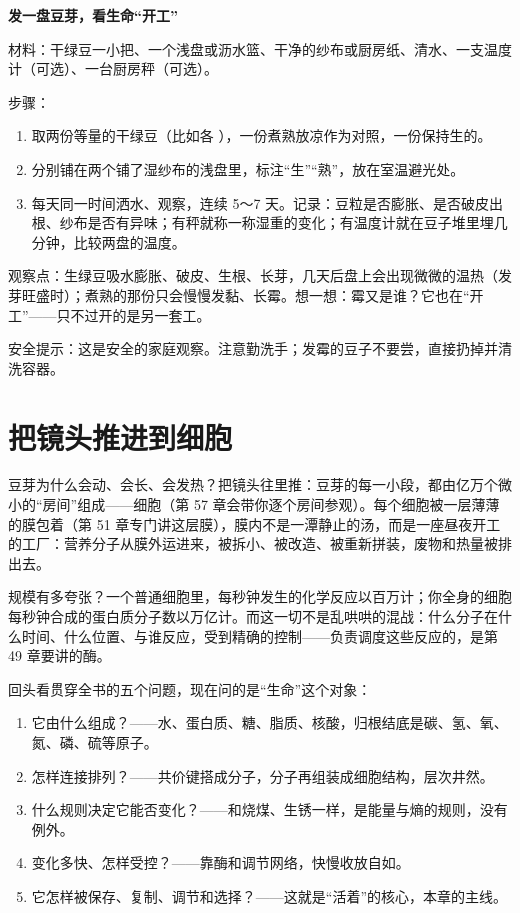 \begin{shiyan}
\textbf{发一盘豆芽，看生命“开工”}

材料：干绿豆一小把、一个浅盘或沥水篮、干净的纱布或厨房纸、清水、一支温度计（可选）、一台厨房秤（可选）。

步骤：
\begin{enumerate}[itemsep=1pt]
\item 取两份等量的干绿豆（比如各 ），一份煮熟放凉作为对照，一份保持生的。
\item 分别铺在两个铺了湿纱布的浅盘里，标注“生”“熟”，放在室温避光处。
\item 每天同一时间洒水、观察，连续 5～7 天。记录：豆粒是否膨胀、是否破皮出根、纱布是否有异味；有秤就称一称湿重的变化；有温度计就在豆子堆里埋几分钟，比较两盘的温度。
\end{enumerate}

观察点：生绿豆吸水膨胀、破皮、生根、长芽，几天后盘上会出现微微的温热（发芽旺盛时）；煮熟的那份只会慢慢发黏、长霉。想一想：霉又是谁？它也在“开工”——只不过开的是另一套工。

安全提示：这是安全的家庭观察。注意勤洗手；发霉的豆子不要尝，直接扔掉并清洗容器。
\end{shiyan}

\section{把镜头推进到细胞}

豆芽为什么会动、会长、会发热？把镜头往里推：豆芽的每一小段，都由亿万个微小的“房间”组成——细胞（第 57 章会带你逐个房间参观）。每个细胞被一层薄薄的膜包着（第 51 章专门讲这层膜），膜内不是一潭静止的汤，而是一座昼夜开工的工厂：营养分子从膜外运进来，被拆小、被改造、被重新拼装，废物和热量被排出去。

规模有多夸张？一个普通细胞里，每秒钟发生的化学反应以百万计；你全身的细胞每秒钟合成的蛋白质分子数以万亿计。而这一切不是乱哄哄的混战：什么分子在什么时间、什么位置、与谁反应，受到精确的控制——负责调度这些反应的，是第 49 章要讲的酶。

回头看贯穿全书的五个问题，现在问的是“生命”这个对象：

\begin{enumerate}[itemsep=2pt]
\item 它由什么组成？——水、蛋白质、糖、脂质、核酸，归根结底是碳、氢、氧、氮、磷、硫等原子。
\item 怎样连接排列？——共价键搭成分子，分子再组装成细胞结构，层次井然。
\item 什么规则决定它能否变化？——和烧煤、生锈一样，是能量与熵的规则，没有例外。
\item 变化多快、怎样受控？——靠酶和调节网络，快慢收放自如。
\item 它怎样被保存、复制、调节和选择？——这就是“活着”的核心，本章的主线。
\end{enumerate}

